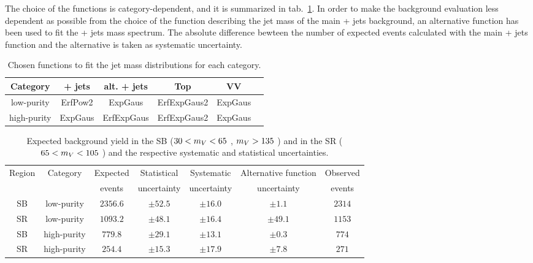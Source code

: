 \noindent The choice of the functions is category-dependent, and it is summarized in tab.~\ref{tab:MassFunctions}. In order to make the background evaluation less dependent as possible from the choice of the function describing the jet mass of the main \V + jets background, an alternative function has been used to fit the \V + jets mass spectrum. The absolute difference bewteen the number of expected events calculated with the main \V + jets function and the alternative is taken as systematic uncertainty.

\begin{table}[!htb]
  \begin{center}
  \caption{Chosen functions to fit the jet mass distributions for each category.}\label{tab:MassFunctions}
    \begin{tabular}{c|ccccc}
      Category & \V + jets & alt. \V + jets & Top & VV \\
      \hline
      \hline
      low-purity  & ErfPow2 & ExpGaus & ErfExpGaus2 & ExpGaus \\ 
      \hdashline
      high-purity & ExpGaus & ErfExpGaus & ErfExpGaus2 & ExpGaus \\
    \end{tabular}
  \end{center}

\end{table}

\begin{table}[!htb]
  \begin{center}
  \caption{Expected background yield in the SB ($30 < m_V < 65$ \GeV, $m_V > 135$ \GeV) and in the SR ($65 < m_V < 105$ \GeV) and the respective systematic and statistical uncertainties.}\label{tab:BkgNorm}
    \begin{tabular}{cc|c|ccc|c}
      Region & Category   & Expected & Statistical       & Systematic     & Alternative function& Observed \\
       &  & events & uncertainty       & uncertainty     & uncertainty & events\\
      \hline
      \hline
      SB     & low-purity & $2356.6$ & $\pm 52.5$ & $\pm 16.0$ & $\pm 1.1$    & $2314$ \\
      SR     & low-purity & $1093.2$  & $\pm 48.1$ & $\pm 16.4$ & $\pm 49.1$   & $1153$ \\
      \hdashline
      SB & high-purity    & $779.8$  & $\pm 29.1$ & $\pm 13.1$ & $\pm 0.3$  & $774$ \\
      SR & high-purity    & $254.4$  & $\pm 15.3$ & $\pm 17.9$ & $\pm 7.8$  & $271$ \\
    \end{tabular}
  \end{center}

\end{table}

